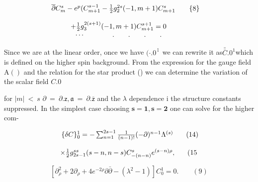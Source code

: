 \documentclass{article}
\begin{document}
\begin{equation}
\begin{array} { c c } { \overline { \partial } C _ { m } ^ { s } - e ^ { p } ( C _ { m + 1 } ^ { s - 1 } - \frac { 1 } { 2 } g _ { 2 } ^ { 2 s } ( - 1, m + 1 ) C _ { m + 1 } ^ { s } \qquad \{ 8 \} } \\ { } & { } \\ { + \frac { 1 } { 2 } g _ { 3 } ^ { 2 ( s + 1 ) } ( - 1, m + 1 ) C _ { m + 1 } ^ { s + 1 } = 0 \qquad } \\ { \cdots \qquad \qquad. \qquad. \qquad. \qquad. \qquad}\end{array}
\end{equation}


Since we are at the linear order, once we have $( \cdot . { 0 } ^ { \mathrm { ~ l ~ } }$ we
can rewrite it as$\bar { \bar { C } } . { 0 } ^ { 1 }$which is defined on the higher spin
background. From the expression for the gauge field A$( )$
and the relation for the star product () we can determine
the variation of the scalar field $C . { 0 }$


for $| m | ~ < ~ s$ $\partial ~ = ~ \partial . { \mathsf { z } }, \mathfrak { a } ~ = ~ \partial . { \overline { \mathsf { z } } }$ and the $\lambda$ dependence i
the structure constants suppressed. In the simplest case
choosing ${ \pmb { s } } = { \pmb { 1 } }, { \pmb { s } } = { \pmb { 2 } }$ one can solve for the higher com-


\begin{equation}
\begin{array} { c c } { \{ \delta C \} _ { 0 } ^ { 1 } = - \sum _ { n = 1 } ^ { 2 s - 1 } \frac { 1 } { ( n - 1 )! } ( - \partial ) ^ { n - 1 } \Lambda ^ { ( s ) } ~ ~ } & { \mathrm { ( 1 4 ) } } \\ { } & { } \\ { \times \frac { 1 } { 2 } g _ { 2 s - 1 } ^ { s s } ( s - n, n - s ) C _ { - ( n - n ) } ^ { s } e ^ { ( s - n ) \rho }, ~ ~ } & { \mathrm { ( 1 5}}\end{array}
\end{equation}


\begin{equation}
\left [ \partial _ { \rho } ^ { 2 } + 2 \partial _ { \rho } + 4 e ^ { - 2 \rho } \partial \bar { \partial } - ( \lambda ^ { 2 } - 1 ) \right ] C _ { 0 } ^ { 1 } = 0. \qquad ( 9 )
\end{equation}
\end{document}

